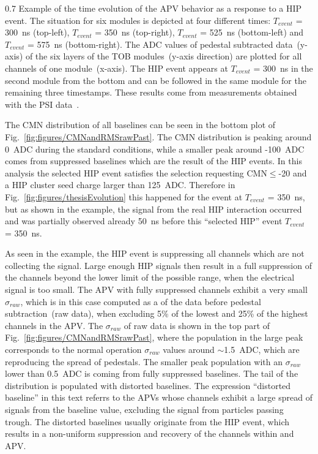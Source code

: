                  {0.7}       %
                 {Example of the time evolution of the APV behavior as a response to a HIP event. The situation for six modules is depicted at four different times:  $T_{event}$ = 300~ns (top-left), $T_{event}$ = 350~ns (top-right), $T_{event}$ = 525~ns (bottom-left) and $T_{event}$ = 575~ns (bottom-right). The ADC values of pedestal subtracted data~(y-axis) of the six layers of the TOB modules~(y-axis direction) are plotted for all channels of one module~(x-axis). The HIP event appears at $T_{event}$ = 300~ns in the second module from the bottom and can be followed in the same module for the remaining three timestamps. These results come from measurements obtained with the PSI data~\cite{Bainbridge:2004jc}.} %

The CMN distribution of all baselines can be seen in the bottom plot of Fig.~\ref{fig:figures/CMNandRMSrawPast}. The CMN distribution is peaking around 0~ADC during the standard conditions, while a smaller peak around -100~ADC comes from suppressed baselines which are the result of the HIP events. In this analysis the selected HIP event satisfies the selection requesting CMN$\leq$-20 and a HIP cluster seed charge larger than 125~ADC. Therefore in Fig.~\ref{fig:figures/thesisEvolution} this happened for the event at $T_{event}$ = 350~ns, but as shown in the example, the signal from the real HIP interaction occurred and was partially observed already 50~ns before this ``selected HIP'' event $T_{event}$ = 350~ns.

As seen in the example, the HIP event is suppressing all channels which are not collecting the signal. Large enough HIP signals then result in a full suppression of the channels beyond the lower limit of the possible range, when the electrical signal is too small. The APV with fully suppressed channels exhibit a very small $\sigma_{raw}$, which is in this case computed as a \SD of the data before pedestal subtraction~(raw data), when excluding 5\% of the lowest and 25\% of the highest channels in the APV. The \SD $\sigma_{raw}$ of raw data is shown in the top part of Fig.~\ref{fig:figures/CMNandRMSrawPast}, where the population in the large peak corresponds to the normal operation $\sigma_{raw}$ values around $\sim$1.5~ADC, which are reproducing the spread of pedestals. The smaller peak population with an $\sigma_{raw}$ lower than 0.5~ADC is coming from fully suppressed baselines. The tail of the distribution is populated with distorted baselines. The expression ``distorted baseline'' in this text referrs to the APVs whose channels exhibit a large spread of signals from the baseline value, excluding the signal from particles passing trough. The distorted baselines usually originate from the HIP event, which results in a non-uniform suppression and recovery of the channels within and APV.

